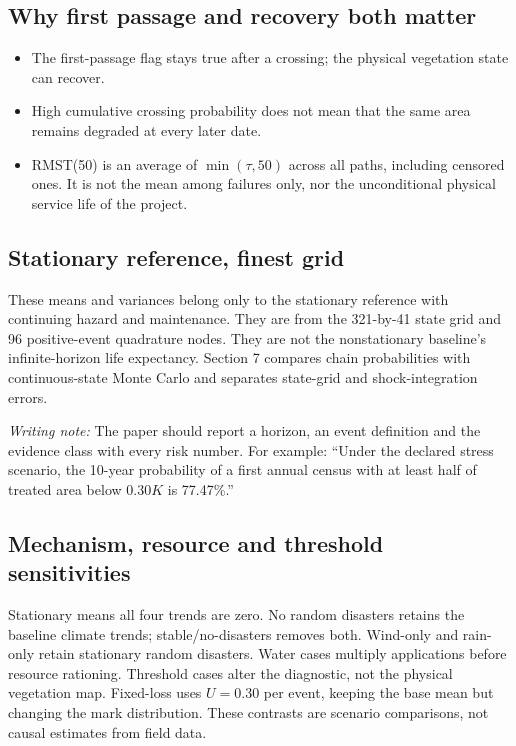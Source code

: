\documentclass[11pt,a4paper]{article}
\newcommand{\note}[1]{\par\smallskip\textcolor{teal!70!black}{\textit{Writing note:} #1}\par}
\begin{document}
\subsection*{Why first passage and recovery both matter}
\begin{itemize}
\item The first-passage flag stays true after a crossing; the physical vegetation state can recover.
\item High cumulative crossing probability does not mean that the same area remains degraded at every later date.
\item RMST(50) is an average of $\min(\tau,50)$ across all paths, including censored ones.
It is not the mean among failures only, nor the unconditional physical service life of the project.
\end{itemize}

\subsection*{Stationary reference, finest grid}
\begin{center}\small\ChainTable\end{center}
These means and variances belong only to the stationary reference with continuing hazard and maintenance.
They are from the 321-by-41 state grid and 96 positive-event quadrature nodes. They are not the
nonstationary baseline's infinite-horizon life expectancy. Section 7 compares chain probabilities with
continuous-state Monte Carlo and separates state-grid and shock-integration errors.

\note{The paper should report a horizon, an event definition and the evidence class with every risk number.
For example: ``Under the declared stress scenario, the 10-year probability of a first annual census
with at least half of treated area below $0.30K$ is 77.47\%.''}

\clearpage
\subsection*{Mechanism, resource and threshold sensitivities}
\begin{center}\small\SensitivityTable\end{center}
Stationary means all four trends are zero. No random disasters retains the baseline climate trends;
stable/no-disasters removes both. Wind-only and rain-only retain stationary random disasters.
Water cases multiply applications before resource rationing. Threshold cases alter the diagnostic,
not the physical vegetation map. Fixed-loss uses $U=0.30$ per event, keeping the base mean but changing
the mark distribution. These contrasts are scenario comparisons, not causal estimates from field data.
\end{document}
